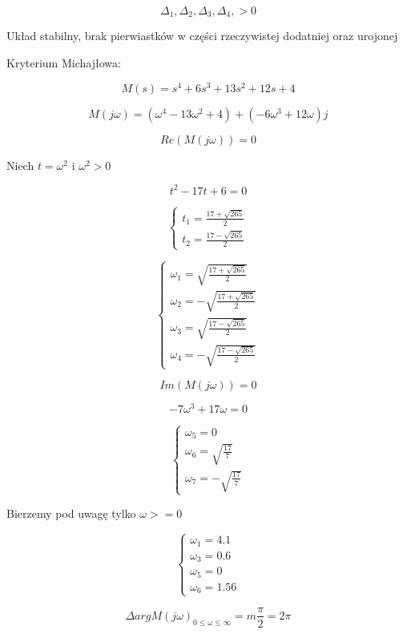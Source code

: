 \documentclass{article}
\begin{document}
\begin{itemize}
    $$ \Delta_{1}, \Delta_{2}, \Delta_{3}, \Delta_{4}, > 0 $$

    Układ stabilny, brak pierwiastków w części rzeczywistej dodatniej oraz urojonej

    Kryterium Michajłowa:
    
    $$M(s)=s^{4}+6s^{3}+13s^{2}+12s+4$$

    $$M(j\omega) = (\omega^{4}-13\omega^{2}+4) + (-6\omega^{3}+12\omega)j$$

    

    $$ Re(M(j\omega))=0 $$

    Niech $t=\omega^{2} $ i $ \omega^{2}>0$

    $$t^{2}-17t+6=0$$

    \[\begin{cases}
        t_{1}=\frac{17+\sqrt{265}}{2}
        \\
        t_{2}=\frac{17-\sqrt{265}}{2}
    \end{cases}\]

    \[\begin{cases}
        \omega_{1}=\sqrt{\frac{17+\sqrt{265}}{2}}
        \\
        \omega_{2}=-\sqrt{\frac{17+\sqrt{265}}{2}}
        \\
        \omega_{3}=\sqrt{\frac{17-\sqrt{265}}{2}}
        \\
        \omega_{4}=-\sqrt{\frac{17-\sqrt{265}}{2}}
    \end{cases}\]

    $$Im(M(j\omega))=0$$

    $$ -7\omega^{3}+17\omega=0 $$

    \[\begin{cases}
        \omega_{5}=0\\
        \omega_{6}=\sqrt{\frac{17}{7}}\\
        \omega_{7}=-\sqrt{\frac{17}{7}}
    \end{cases}\]

    Bierzemy pod uwagę tylko $\omega>=0$

    \[\begin{cases}
        \omega_{1}=4.1\\
        \omega_{3}=0.6\\
        \omega_{5}=0\\
        \omega_{6}=1.56
    \end{cases}\]

    $$\Delta argM(j\omega)_{0\leq \omega \le \infty }=m\frac{\pi}{2}=2\pi$$


\end{itemize}
\end{document}
